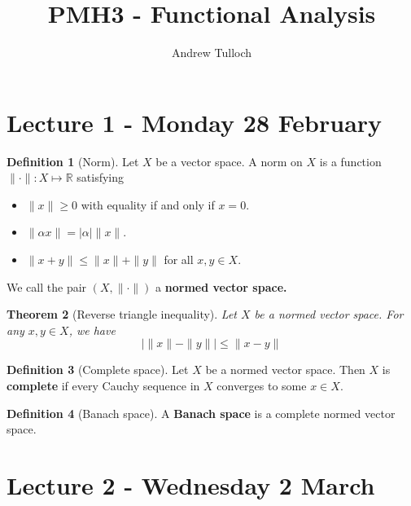 \documentclass[10pt, oneside, reqno]{amsart}
\title{PMH3 - Functional Analysis}                              %
\author{Andrew Tulloch}
\theoremstyle{plain}%
\newtheorem{thm}{Theorem}[section]
\theoremstyle{definition}
\newtheorem{defn}[thm]{Definition}
\theoremstyle{remark}
\newcommand{\R}{\mathbb{R}}
\begin{document}
\maketitle \tableofcontents \clearpage

\section{Lecture 1 - Monday 28 February} %
\label{sec:lecture_1_28_february}

\begin{defn}[Norm]
    Let $X$ be a vector space.  A norm on $X$ is a function $\| \cdot \| : X \mapsto \R$ satisfying 
    \begin{itemize}
        \item $\| x \| \geq 0$ with equality if and only if $x = 0$.  
        \item $\| \alpha x \| = | \alpha | \| x \|$.
        \item $\| x + y \| \leq \| x \| + \| y \|$ for all $x, y \in X$.  
    \end{itemize}
    
    We call the pair $(X, \| \cdot \|)$ a \textbf{normed vector space.}
\end{defn}

\begin{thm}[Reverse triangle inequality]
    Let $X$ be a normed vector space.  For any $x, y \in X$, we have \[
        \left| \|x \| - \| y \| \right| \leq \| x - y \|  
    \]
\end{thm}

\begin{defn}[Complete space]
    Let $X$ be a normed vector space.  Then $X$ is \textbf{complete} if every Cauchy sequence in $X$ converges to some $x \in X$.  
\end{defn}

\begin{defn}[Banach space]
    A \textbf{Banach space} is a complete normed vector space.
\end{defn}



\section{Lecture 2 - Wednesday 2 March} %
\label{sec:lecture_2_2_march}
\end{document}
